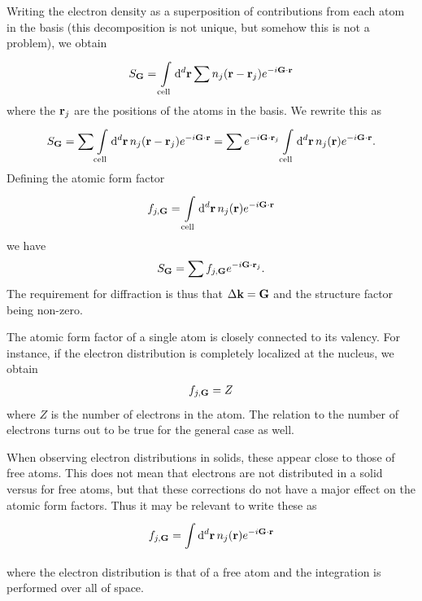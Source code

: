 Writing the electron density as a superposition of contributions from each atom in the basis (this decomposition is not unique, but somehow this is not a problem), we obtain
\begin{align*}
	S_{\vb{G}} = \integ[d]{\text{cell}}{}{\vb{r}}{\sum n_{j}(\vb{r} - \vb{r}_{j})e^{-i\vb{G}\cdot\vb{r}}}
\end{align*}
where the $\vb{r}_{j}$ are the positions of the atoms in the basis. We rewrite this as
\begin{align*}
	S_{\vb{G}} = \sum\integ[d]{\text{cell}}{}{\vb{r}}{n_{j}(\vb{r} - \vb{r}_{j})e^{-i\vb{G}\cdot\vb{r}}} = \sum e^{-i\vb{G}\cdot\vb{r}_{j}}\integ[d]{\text{cell}}{}{\vb{r}}{n_{j}(\vb{r})e^{-i\vb{G}\cdot\vb{r}}}.
\end{align*}
Defining the atomic form factor
\begin{align*}
	f_{j, \vb{G}} = \integ[d]{\text{cell}}{}{\vb{r}}{n_{j}(\vb{r})e^{-i\vb{G}\cdot\vb{r}}}
\end{align*}
we have
\begin{align*}
	S_{\vb{G}} = \sum f_{j, \vb{G}}e^{-i\vb{G}\cdot\vb{r}_{j}}.
\end{align*}
The requirement for diffraction is thus that $\Delta\vb{k} = \vb{G}$ and the structure factor being non-zero.

The atomic form factor of a single atom is closely connected to its valency. For instance, if the electron distribution is completely localized at the nucleus, we obtain
\begin{align*}
	f_{j, \vb{G}} = Z
\end{align*}
where $Z$ is the number of electrons in the atom. The relation to the number of electrons turns out to be true for the general case as well.

When observing electron distributions in solids, these appear close to those of free atoms. This does not mean that electrons are not distributed in a solid versus for free atoms, but that these corrections do not have a major effect on the atomic form factors. Thus it may be relevant to write these as
\begin{align*}
	f_{j, \vb{G}} = \integ[d]{}{}{\vb{r}}{n_{j}(\vb{r})e^{-i\vb{G}\cdot\vb{r}}}
\end{align*}
where the electron distribution is that of a free atom and the integration is performed over all of space.

